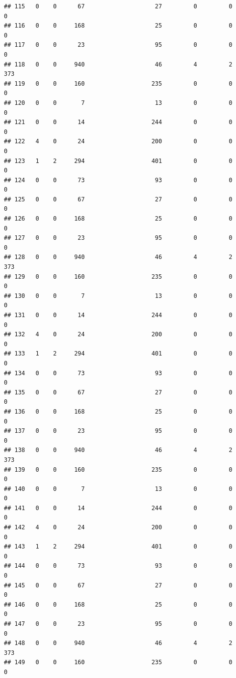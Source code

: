 \documentclass[
]{article}
\begin{document}
\begin{verbatim}
## 115   0    0      67                    27         0         0        0
## 116   0    0     168                    25         0         0        0
## 117   0    0      23                    95         0         0        0
## 118   0    0     940                    46         4         2      373
## 119   0    0     160                   235         0         0        0
## 120   0    0       7                    13         0         0        0
## 121   0    0      14                   244         0         0        0
## 122   4    0      24                   200         0         0        0
## 123   1    2     294                   401         0         0        0
## 124   0    0      73                    93         0         0        0
## 125   0    0      67                    27         0         0        0
## 126   0    0     168                    25         0         0        0
## 127   0    0      23                    95         0         0        0
## 128   0    0     940                    46         4         2      373
## 129   0    0     160                   235         0         0        0
## 130   0    0       7                    13         0         0        0
## 131   0    0      14                   244         0         0        0
## 132   4    0      24                   200         0         0        0
## 133   1    2     294                   401         0         0        0
## 134   0    0      73                    93         0         0        0
## 135   0    0      67                    27         0         0        0
## 136   0    0     168                    25         0         0        0
## 137   0    0      23                    95         0         0        0
## 138   0    0     940                    46         4         2      373
## 139   0    0     160                   235         0         0        0
## 140   0    0       7                    13         0         0        0
## 141   0    0      14                   244         0         0        0
## 142   4    0      24                   200         0         0        0
## 143   1    2     294                   401         0         0        0
## 144   0    0      73                    93         0         0        0
## 145   0    0      67                    27         0         0        0
## 146   0    0     168                    25         0         0        0
## 147   0    0      23                    95         0         0        0
## 148   0    0     940                    46         4         2      373
## 149   0    0     160                   235         0         0        0

\end{verbatim}
\end{document}

